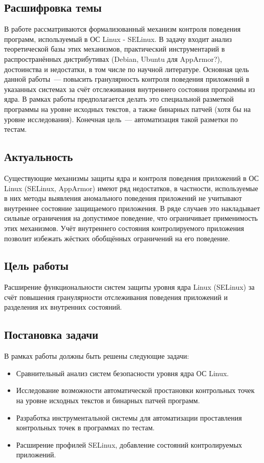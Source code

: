 \subsection{Расшифровка темы}
В работе рассматриваются формализованный 
механизм контроля поведения программ, 
используемый в ОС Linux - SELinux. 
В задачу входит анализ теоретической базы 
этих механизмов, практический инструментарий
в распространённых дистрибутивах (Debian, 
Ubuntu для AppArmor?), достоинства и 
недостатки, в том числе по научной 
литературе. Основная цель данной работы~--- 
повысить гранулярность контроля поведения 
приложений в указанных системах за счёт 
отслеживания внутреннего состояния программы 
из ядра. В рамках работы предполагается делать 
это специальной разметкой программы на уровне 
исходных текстов, а также бинарных патчей (хотя 
бы на уровне исследования). Конечная цель~--- 
автоматизация такой разметки по тестам.

\subsection{Актуальность} 
Существующие механизмы защиты ядра и 
контроля поведения приложений в ОС Linux 
(SELinux, AppArmor) имеют ряд недостатков, 
в частности, используемые в них методы 
выявления аномального поведения приложений 
не учитывают внутреннее состояние защищаемого 
приложения. В ряде случаев это накладывает 
сильные ограничения на допустимое поведение, 
что ограничивает применимость этих механизмов. 
Учёт внутреннего состояния контролируемого 
приложения позволит избежать жёстких обобщённых 
ограничений на его поведение.

\subsection{Цель работы} 
Расширение функциональности систем защиты 
уровня ядра Linux (SELinux) за счёт повышения 
гранулярности отслеживания поведения приложений 
и разделения их внутренних состояний.

\subsection{Постановка задачи}
В рамках работы должны быть решены следующие задачи:
\begin{itemize}
\item Сравнительный анализ систем безопасности 
	уровня ядра ОС Linux.
\item Исследование возможности автоматической 
	простановки контрольных точек на уровне 
	исходных текстов и бинарных патчей программ.
\item Разработка инструментальной системы для 
	автоматизации проставления контрольных точек 
	в программах по тестам. 
\item Расширение профилей SELinux, добавление 
	состояний контролируемых приложений. 
\end{itemize}
\bigskip
